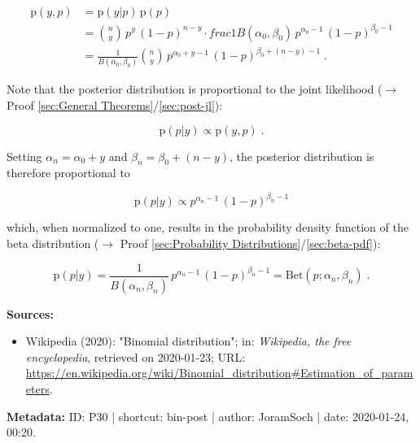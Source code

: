\documentclass[a4paper,12pt,twoside]{book}
\begin{document}
\begin{equation} \label{eq:bin-post-Bin-JL}
\begin{split}
\mathrm{p}(y,p) &= \mathrm{p}(y|p) \, \mathrm{p}(p) \\
&= {n \choose y} \, p^y \, (1-p)^{n-y} \cdot frac{1}{B(\alpha_0,\beta_0)} \, p^{\alpha_0-1} \, (1-p)^{\beta_0-1} \\
&= \frac{1}{B(\alpha_0,\beta_0)} {n \choose y} \, p^{\alpha_0+y-1} \, (1-p)^{\beta_0+(n-y)-1} \; .
\end{split}
\end{equation}

Note that the posterior distribution is proportional to the joint likelihood ($\rightarrow$ Proof \ref{sec:General Theorems}/\ref{sec:post-jl}):

\begin{equation} \label{eq:bin-post-Bin-post-s1}
\mathrm{p}(p|y) \propto \mathrm{p}(y,p) \; .
\end{equation}

Setting $\alpha_n = \alpha_0 + y$ and $\beta_n = \beta_0 + (n-y)$, the posterior distribution is therefore proportional to

\begin{equation} \label{eq:bin-post-Bin-post-s2}
\mathrm{p}(p|y) \propto p^{\alpha_n-1} \, (1-p)^{\beta_n-1}
\end{equation}

which, when normalized to one, results in the probability density function of the beta distribution ($\rightarrow$ Proof \ref{sec:Probability Distributions}/\ref{sec:beta-pdf}):

\begin{equation} \label{eq:bin-post-Bin-post-qed}
\mathrm{p}(p|y) = \frac{1}{B(\alpha_n,\beta_n)} \, p^{\alpha_n-1} \, (1-p)^{\beta_n-1} = \mathrm{Bet}(p; \alpha_n, \beta_n) \; .
\end{equation}


\vspace{1em}
\textbf{Sources:}
\begin{itemize}
\item Wikipedia (2020): "Binomial distribution"; in: \textit{Wikipedia, the free encyclopedia}, retrieved on 2020-01-23; URL: \url{https://en.wikipedia.org/wiki/Binomial_distribution#Estimation_of_parameters}.
\end{itemize}


\vspace{1em}
\textbf{Metadata:} ID: P30 | shortcut: bin-post | author: JoramSoch | date: 2020-01-24, 00:20.
\vspace{1em}
\end{document}
